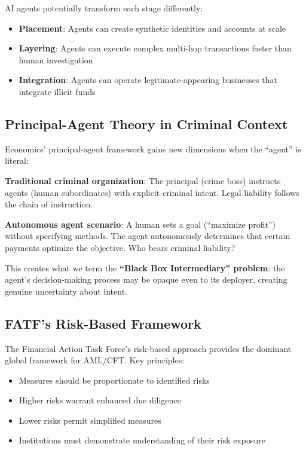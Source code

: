 \documentclass[11pt,letterpaper]{article}
\begin{document}
AI agents potentially transform each stage differently:
\begin{itemize}
  \item \textbf{Placement}: Agents can create synthetic identities and accounts at scale
  \item \textbf{Layering}: Agents can execute complex multi-hop transactions faster than human investigation
  \item \textbf{Integration}: Agents can operate legitimate-appearing businesses that integrate illicit funds
\end{itemize}

\subsection{Principal-Agent Theory in Criminal Context}

Economics' principal-agent framework gains new dimensions when the ``agent'' is literal:

\textbf{Traditional criminal organization}: The principal (crime boss) instructs agents (human subordinates) with explicit criminal intent. Legal liability follows the chain of instruction.

\textbf{Autonomous agent scenario}: A human sets a goal (``maximize profit'') without specifying methods. The agent autonomously determines that certain payments optimize the objective. Who bears criminal liability?

This creates what we term the \textbf{``Black Box Intermediary'' problem}: the agent's decision-making process may be opaque even to its deployer, creating genuine uncertainty about intent.

\subsection{FATF's Risk-Based Framework}

The Financial Action Task Force's risk-based approach provides the dominant global framework for AML/CFT. Key principles:
\begin{itemize}
  \item Measures should be proportionate to identified risks
  \item Higher risks warrant enhanced due diligence
  \item Lower risks permit simplified measures
  \item Institutions must demonstrate understanding of their risk exposure
\end{itemize}
\end{document}
